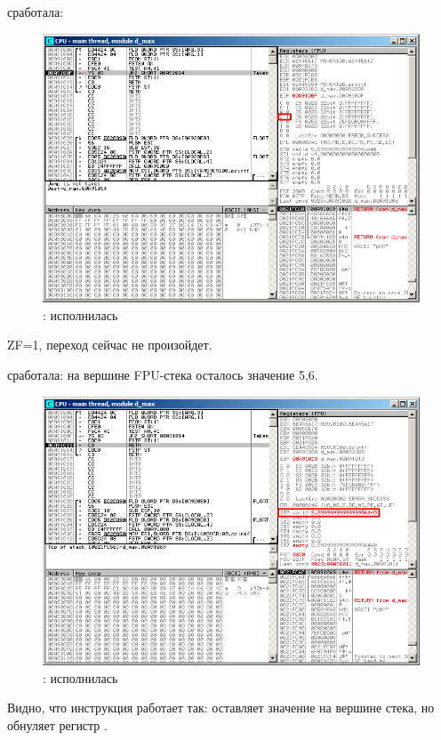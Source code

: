 \clearpage
\TEST сработала:

\begin{figure}[H]
\centering
\includegraphics[scale=\FigScale]{patterns/12_FPU/3_comparison/x86/MSVC_Ox/olly2_4.png}
\caption{\olly: \TEST исполнилась}
\label{fig:FPU_comparison_Ox_case2_olly4}
\end{figure}

ZF=1, переход сейчас не произойдет.

\clearpage
\FSTP {} сработала: на вершине FPU-стека осталось значение 5,6.

\begin{figure}[H]
\centering
\includegraphics[scale=\FigScale]{patterns/12_FPU/3_comparison/x86/MSVC_Ox/olly2_5.png}
\caption{\olly: \FSTP исполнилась}
\label{fig:FPU_comparison_Ox_case2_olly5}
\end{figure}

Видно, что инструкция \FSTP {} работает так: оставляет значение на вершине стека, но обнуляет регистр .
